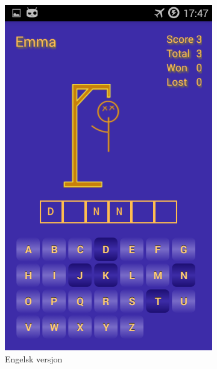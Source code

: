 \begin{figure}[ht]
    \centering
   \begin{subfigure}[b]{0.25\textwidth}
        \includegraphics[width=\textwidth]{./img/losninger/1.png}
        \caption{Engelsk versjon}
        \label{fig:aktivitet_engelsk}
    \end{subfigure}
    \begin{subfigure}[b]{0.25\textwidth}

\end{subfigure}
\end{figure}
